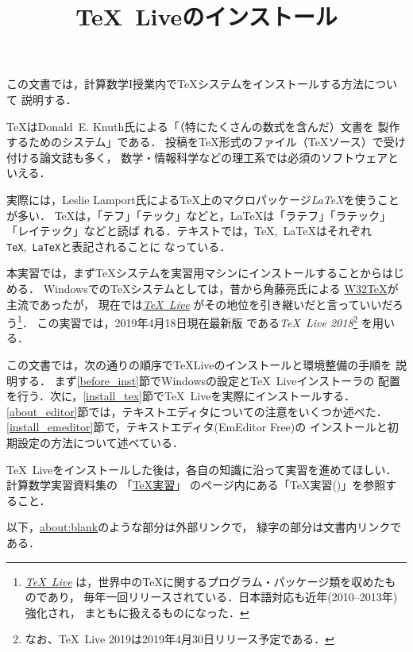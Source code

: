 \documentclass{ltjsarticle}
\title{\TeX~Liveのインストール}
\begin{document}
\zw
\maketitle

この文書では，計算数学I授業内で\TeX システムをインストールする方法について
説明する．
\medskip

\TeX はDonald~E. Knuth氏による「（特にたくさんの数式を含んだ）文書を
製作するためのシステム」である．
投稿を\TeX 形式のファイル（\TeX ソース）で受け付ける論文誌も多く，
数学・情報科学などの理工系では必須のソフトウェアといえる．
\medskip

実際には，Leslie Lamport氏による\TeX 上のマクロパッケージ\emph{\LaTeX}を使うことが多い．
\TeX は，「テフ」「テック」などと，\LaTeX は「ラテフ」「ラテック」「レイテック」などと読ば
れる．テキストでは，\TeX,~\LaTeX はそれぞれ\texttt{TeX},~\texttt{LaTeX}と表記されることに
なっている．
\medskip

本実習では，まず\TeX システムを実習用マシンにインストールすることからはじめる．
Windowsでの\TeX システムとしては，昔から角藤亮氏による
\href{http://w32tex.org/index-ja.html}{W32\TeX}が主流であったが，
現在では\href{http://www.tug.org/texlive/}{\emph{\TeX\ Live}}%
がその地位を引き継いだと言っていいだろう\footnote{%
  \href{http://www.tug.org/texlive/}{\emph{\TeX~Live}}%
  は，世界中の\TeX に関するプログラム・パッケージ類を収めたものであり，
  毎年一回リリースされている．日本語対応も近年(2010--2013年)強化され，
  まともに扱えるものになった．
}．
この実習では，2019年4月18日現在最新版
である\emph{\TeX\ Live 2018}\footnote{%
  なお、\TeX\ Live 2019は2019年4月30日リリース予定である．
}%
を用いる．
\medskip

この文書では，次の通りの順序で\TeX Liveのインストールと環境整備の手順を
説明する．
まず\ref{before_inst}節でWindowsの設定と\TeX\ Liveインストーラの
配置を行う．次に，\ref{install_tex}節で\TeX\ Liveを実際にインストールする．
\ref{about_editor}節では，テキストエディタについての注意をいくつか述べた．
\ref{install_emeditor}節で，テキストエディタ(EmEditor Free)の
インストールと初期設定の方法について述べている．
\medskip

\TeX~Liveをインストールした後は，各自の知識に沿って実習を進めてほしい．
計算数学実習資料集の
「\href{https://github.com/utmsks/KSImaterial/blob/master/contents/tex/tex_practice.md}{\TeX 実習}」
のページ内にある「\TeX 実習()」を参照すること．

\medskip
以下，\url{about:blank}のような部分は外部リンクで，
緑字の部分は文書内リンクである．
\end{document}
